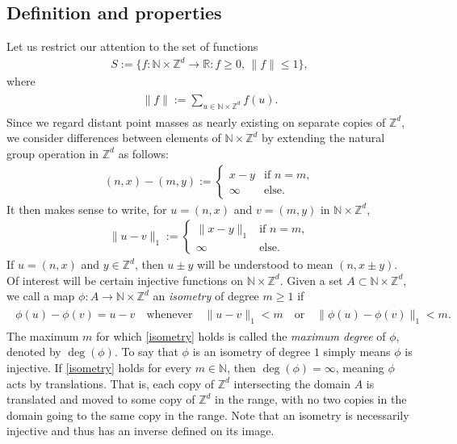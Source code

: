 \documentclass[11pt,reqno]{amsart}
\numberwithin{equation}{section}
\theoremstyle{definition}
\begin{document}
\subsection{Definition and properties} \label{topology-definitions}
Let us restrict our attention to the set of functions
{\begin{align*} {
S := \{f : {\mathbb{N}} \times {\mathbb{Z}}^d \to {\mathbb{R}} : f \geq 0,\, \|f\| \leq 1\},
} \end{align*}}
where
{\begin{align} \begin{split} {
\|f\| := \sum_{u \in {\mathbb{N}} \times {\mathbb{Z}}^d} f(u). \label{norm_def}
} \end{split} \end{align}}
Since we regard distant point masses as nearly existing on separate copies of ${\mathbb{Z}}^d$, we consider
differences between elements of ${\mathbb{N}} \times {\mathbb{Z}}^d$ by extending the natural group operation in ${\mathbb{Z}}^d$ as follows:
{\begin{align*} {
(n,x) - (m,y) := \begin{cases}
x - y &\text{if } n = m, \\
\infty &\text{else}.
\end{cases}
} \end{align*}}
It then makes sense to write, for $u = (n,x)$ and $v = (m,y)$ in ${\mathbb{N}} \times {\mathbb{Z}}^d$,
{\begin{align*} {
\|u - v\|_1 := \begin{cases}
\|x - y\|_1 &\text{if } n = m, \\
\infty &\text{else}.
\end{cases}
} \end{align*}}
If $u = (n,x)$ and $y \in {\mathbb{Z}}^d$, then $u \pm y$ will be understood to mean $(n,x\pm y)$.
Of interest will be certain injective functions on ${\mathbb{N}} \times {\mathbb{Z}}^d$.
Given a set $A \subset {\mathbb{N}} \times {\mathbb{Z}}^d$, we call a map $\phi: A \to {\mathbb{N}} \times {\mathbb{Z}}^d$ an \textit{isometry} of degree $m \geq 1$ if
{\begin{align} \begin{split} {
\phi(u) - \phi(v) = u - v 
\quad \text{whenever} \quad 
\|u - v\|_1 < m
\quad \text{or} \quad
\|\phi(u) - \phi(v)\|_1 < m. \label{isometry}
} \end{split} \end{align}}
The maximum $m$ for which \eqref{isometry} holds is called the \textit{maximum degree} of $\phi$, denoted by $\deg(\phi)$.
To say that $\phi$ is an isometry of degree $1$ simply means $\phi$ is injective.
If \eqref{isometry} holds for every $m \in {\mathbb{N}}$, then $\deg(\phi) = \infty$, meaning $\phi$ acts by translations. That is, each copy of ${\mathbb{Z}}^d$ intersecting the domain $A$ is translated and moved to some copy of ${\mathbb{Z}}^d$ in the range, with no two copies in the domain going to the same copy in the range.
Note that an isometry is necessarily injective and thus has an inverse defined on its image.
\end{document}
